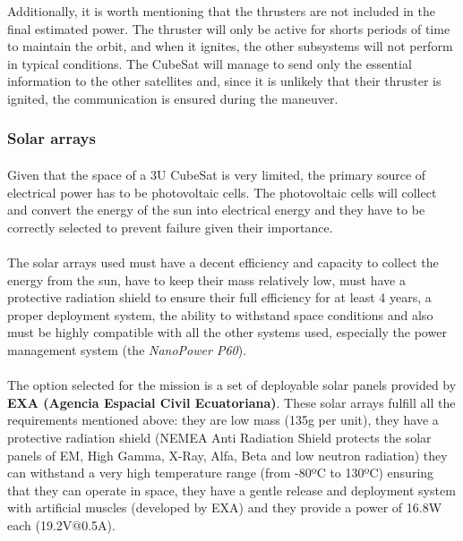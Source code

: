 Additionally, it is worth mentioning that the thrusters are not included in the final estimated power. The thruster will only be active for shorts periods of time to maintain the orbit, and when it ignites, the other subsystems will not perform in typical conditions. The CubeSat will manage to send only the essential information to the other satellites and, since it is unlikely that their thruster is ignited, the communication is ensured during the maneuver.

\subsubsection{Solar arrays}

\paragraph{}Given that the space of a 3U CubeSat is very limited, the primary source of electrical power has to be photovoltaic cells. The photovoltaic cells will collect and convert the energy of the sun into electrical energy and they have to be correctly selected to prevent failure given their importance. 

\paragraph{}The solar arrays used must have a decent efficiency and capacity to collect the energy from the sun, have to keep their mass relatively low, must have a protective radiation shield to ensure their full efficiency for at least 4 years, a proper deployment system, the ability to withstand space conditions and also must be highly compatible with all the other systems used, especially the power management system (the \textit{NanoPower P60}).

\paragraph{}The option selected for the mission is a set of deployable solar panels provided by \textbf{EXA (Agencia Espacial Civil Ecuatoriana)}. These solar arrays fulfill all the requirements mentioned above: they are low mass (135g per unit), they have a protective radiation shield (NEMEA Anti Radiation Shield protects the solar panels of EM, High Gamma, X-Ray, Alfa, Beta and low neutron radiation) they can withstand a very high temperature range (from -80ºC to 130ºC) ensuring that they can operate in space, they have a gentle release and deployment system with artificial muscles (developed by EXA) and they provide a power of 16.8W each (19.2V@0.5A).

